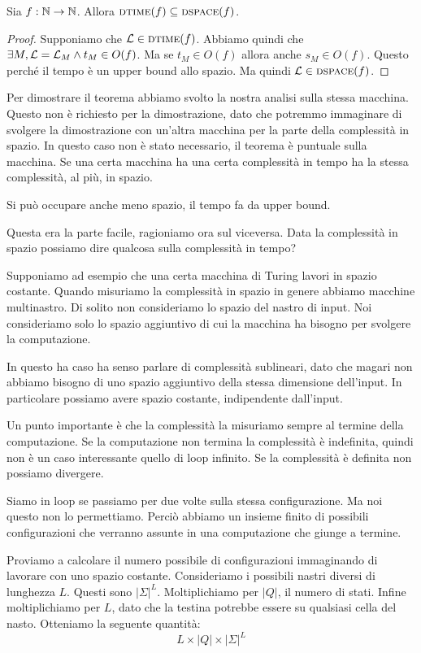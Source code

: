\begin{thm}
    Sia $f: \mathbb{N} \to \mathbb{N}$. Allora $\textsc{dtime}(f) \subseteq \textsc{dspace}(f)$.
\end{thm}
\begin{proof}
    Supponiamo che $\mathcal{L} \in \textsc{dtime}(f)$. Abbiamo quindi che $\exists M, \mathcal{L} = \mathcal{L}_{M} \land
    t_{M} \in O(f)$. Ma se $t_{M} \in O(f)$ allora anche $s_{M} \in O(f)$. Questo perché il tempo
    è un upper bound allo spazio. Ma quindi $\mathcal{L} \in \textsc{dspace}(f)$.
\end{proof}

Per dimostrare il teorema abbiamo svolto la nostra analisi sulla stessa macchina. Questo non è
richiesto per la dimostrazione, dato che potremmo immaginare di svolgere la dimostrazione con
un'altra macchina per la parte della complessità in spazio. In questo caso non è stato necessario,
il teorema è puntuale sulla macchina. Se una certa macchina ha una certa complessità in tempo ha la
stessa complessità, al più, in spazio.

Si può occupare anche meno spazio, il tempo fa da upper bound.

Questa era la parte facile, ragioniamo ora sul viceversa. Data la complessità in spazio possiamo
dire qualcosa sulla complessità in tempo?

Supponiamo ad esempio che una certa macchina di Turing lavori in spazio costante. Quando misuriamo
la complessità in spazio in genere abbiamo macchine multinastro. Di solito non consideriamo lo
spazio del nastro di input. Noi consideriamo solo lo spazio aggiuntivo di cui la macchina ha bisogno
per svolgere la computazione.

In questo ha caso ha senso parlare di complessità sublineari, dato che magari non abbiamo bisogno
di uno spazio aggiuntivo della stessa dimensione dell'input. In particolare possiamo avere spazio
costante, indipendente dall'input.

Un punto importante è che la complessità la misuriamo sempre al termine della computazione. Se la
computazione non termina la complessità è indefinita, quindi non è un caso interessante quello di
loop infinito. Se la complessità è definita non possiamo divergere.

Siamo in loop se passiamo per due volte sulla stessa configurazione. Ma noi questo non lo
permettiamo. Perciò abbiamo un insieme finito di possibili configurazioni che verranno assunte in
una computazione che giunge a termine.

Proviamo a calcolare il numero possibile di configurazioni immaginando di lavorare con uno spazio
costante. Consideriamo i possibili nastri diversi di lunghezza $L$. Questi sono $|\Sigma|^{L}$.
Moltiplichiamo per $|Q|$, il numero di stati. Infine moltiplichiamo per $L$, dato che la testina
potrebbe essere su qualsiasi cella del nasto. Otteniamo la seguente quantità:
\begin{equation*}
    L \times |Q| \times |\Sigma|^{L}
\end{equation*}

